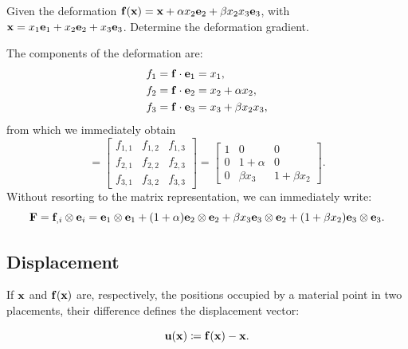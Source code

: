 \begin{exercise}  
	Given the deformation $\mathbf{f}(\mathbf{x})=\mathbf{x}+\alpha x_2\mathbf{e}_2+\beta x_2x_3\mathbf{e}_3$, with $\mathbf{x}=x_1\mathbf{e}_1+x_2\mathbf{e}_2+x_3\mathbf{e}_3$. Determine the deformation gradient.  
	\begin{svolgimento}  
		The components of the deformation are:  
		\begin{equation}  
			\begin{aligned}  
				&f_{1}=\mathbf{f}\cdot \mathbf{e}_{1}=x_{1},\\  
				&f_{2}=\mathbf{f}\cdot \mathbf{e}_{2}=x_{2}+\alpha x_{2},\\  
				&f_{3}=\mathbf{f}\cdot \mathbf{e}_{3}=x_{3}+\beta x_{2}x_{3},  
			\end{aligned}  
		\end{equation}  
		from which we immediately obtain  
		\begin{equation}  
			[\Fb]=  
			\begin{bmatrix}  
				f_{1,1}&f_{1,2}&f_{1,3}\\f_{2,1}&f_{2,2}&f_{2,3}\\f_{3,1}&f_{3,2}&f_{3,3}  
			\end{bmatrix}=  
			\begin{bmatrix}  
				1&0&0\\0&1+\alpha&0\\0&\beta x_3&1+\beta x_2  
			\end{bmatrix}.  
		\end{equation}  
		Without resorting to the matrix representation, we can immediately write:  
		\begin{equation}  
			\mathbf{F}=\mathbf{f}_{,i}\otimes\mathbf{e}_i=\mathbf{e}_1\otimes\mathbf{e}_1+(1+\alpha)\mathbf{e}_2\otimes\mathbf{e}_2+\beta x_3\mathbf{e}_3\otimes\mathbf{e}_2+(1+\beta x_2)\mathbf{e}_3\otimes\mathbf{e}_3.  
		\end{equation}  
	\end{svolgimento}  
\end{exercise}  


\subsection{Displacement}  
If $\mathbf{x}$ and $\mathbf{f}(\mathbf{x})$ are, respectively, the positions occupied by a material point in two placements, their difference defines the displacement vector:  
\begin{definition}  
	\begin{equation}  
		\mathbf{u}(\mathbf{x})\coloneqq\mathbf{f}(\mathbf{x})-\mathbf{x}.  
	\end{equation}  
\end{definition}  

